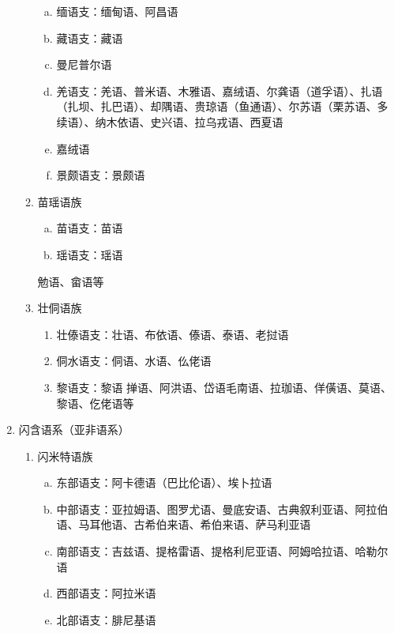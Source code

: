 \documentclass[12pt]{book}
\begin{document}
\begin{enumerate}[1.]
\begin{enumerate}[(1)]
\begin{enumerate}[a.]
                        \item 缅语支：缅甸语、阿昌语
                        \item 藏语支：藏语
                        \item 曼尼普尔语
                        \item 羌语支：羌语、普米语、木雅语、嘉绒语、尔龚语（道孚语）、扎语（扎坝、扎巴语）、却隅语、贵琼语（鱼通语）、尔苏语（栗苏语、多续语）、纳木依语、史兴语、拉乌戎语、西夏语
                        \item 嘉绒语
                        \item 景颇语支：景颇语
                    \end{enumerate}
              \item 苗瑶语族
              \begin{enumerate}[a.]
                  \item 苗语支：苗语
                  \item 瑶语支：瑶语
              \end{enumerate}
              勉语、畲语等
              \item 壮侗语族
              \begin{enumerate}[a]
                  \item 壮傣语支：壮语、布依语、傣语、泰语、老挝语
                  \item 侗水语支：侗语、水语、仫佬语
                  \item 黎语支：黎语
                  掸语、阿洪语、岱语毛南语、拉珈语、佯僙语、莫语、黎语、仡佬语等
              \end{enumerate}
          \end{enumerate}
    \item 闪含语系（亚非语系）
          \begin{enumerate}[(1)]
              \item 闪米特语族
              \begin{enumerate}[a.]
                \item 东部语支：阿卡德语（巴比伦语）、埃卜拉语
                \item 中部语支：亚拉姆语、图罗尤语、曼底安语、古典叙利亚语、阿拉伯语、马耳他语、古希伯来语、希伯来语、萨马利亚语
                \item 南部语支：吉兹语、提格雷语、提格利尼亚语、阿姆哈拉语、哈勒尔语
                \item 西部语支：阿拉米语
                \item 北部语支：腓尼基语

\end{enumerate}
\end{enumerate}
\end{enumerate}
\end{document}
